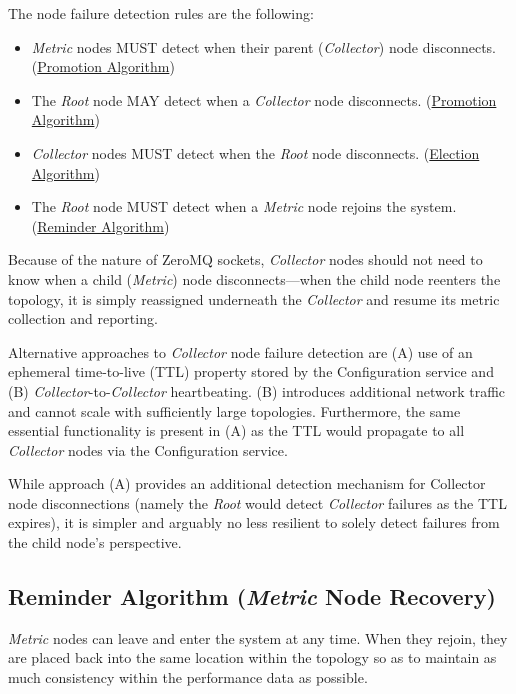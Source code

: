 The \dcamp node failure detection rules are the following:

\begin{itemize}
\item \textit{Metric} nodes MUST detect when their parent (\textit{Collector}) node disconnects.
      (\hyperref[algor_promo]{Promotion Algorithm})
\item The \textit{Root} node MAY detect when a \textit{Collector} node disconnects. (\hyperref[algor_promo]{Promotion
      Algorithm})
\item \textit{Collector} nodes MUST detect when the \textit{Root} node disconnects. (\hyperref[algor_elect]{Election
      Algorithm})
\item The \textit{Root} node MUST detect when a \textit{Metric} node rejoins the system.
      (\hyperref[algor_remind]{Reminder Algorithm})
\end{itemize}

Because of the nature of ZeroMQ sockets, \textit{Collector} nodes should not need to know when a child (\textit{Metric})
node disconnects---when the child node reenters the topology, it is simply reassigned underneath the \textit{Collector}
and resume its metric collection and reporting.

Alternative approaches to \textit{Collector} node failure detection are (A) use of an ephemeral time-to-live (TTL)
property stored by the Configuration service and (B) \textit{Collector}-to-\textit{Collector} heartbeating. (B)
introduces additional network traffic and cannot scale with sufficiently large topologies. Furthermore, the same
essential functionality is present in (A) as the TTL would propagate to all \textit{Collector} nodes via the
Configuration service.

While approach (A) provides an additional detection mechanism for Collector node disconnections (namely the
\textit{Root} would detect \textit{Collector} failures as the TTL expires), it is simpler and arguably no less resilient
to solely detect failures from the child node's perspective.

\subsection{Reminder Algorithm (\textit{Metric} Node Recovery)}
\label{algor_remind}

\textit{Metric} nodes can leave and enter the \dcamp system at any time. When they rejoin, they are placed back into the
same location within the topology so as to maintain as much consistency within the performance data as possible.

